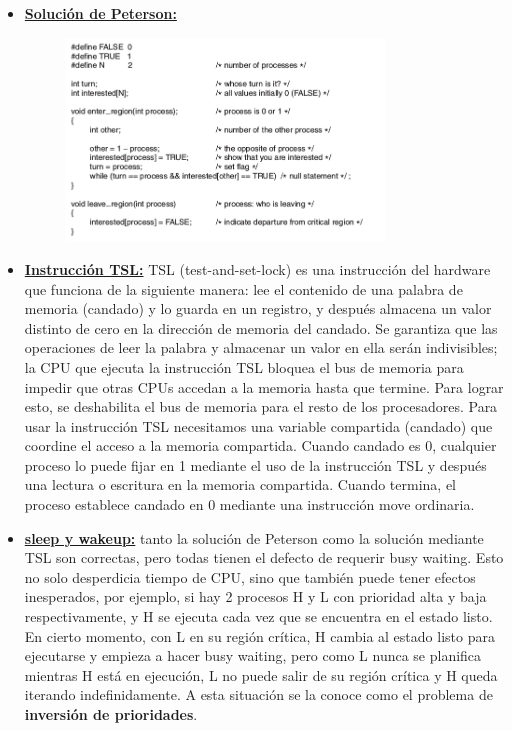 \begin{itemize}
\item \textbf{\underline{Solución de Peterson:}}

\begin{figure}[h]
	\begin{center}
	\includegraphics[width=0.8\textwidth]{imagenes/peterson.jpg}
	\end{center}
\end{figure}

\item \textbf{\underline{Instrucción TSL:}} TSL (test-and-set-lock) es una instrucción del hardware que funciona de la siguiente manera: lee el contenido de una palabra de memoria (candado) y lo guarda en un registro, y después almacena un valor distinto de cero en la dirección de memoria del candado. Se garantiza que las operaciones de leer la palabra y almacenar un valor en ella serán indivisibles; la CPU que ejecuta la instrucción TSL bloquea el bus de memoria para impedir que otras CPUs accedan a la memoria hasta que termine. Para lograr esto, se deshabilita el bus de memoria para el resto de los procesadores. Para usar la instrucción TSL necesitamos una variable compartida (candado) que coordine el acceso a la memoria compartida. Cuando candado es 0, cualquier proceso lo puede fijar en 1 mediante el uso de la instrucción TSL y después una lectura o escritura en la memoria compartida. Cuando termina, el proceso establece candado en 0 mediante una instrucción move ordinaria.

\item \textbf{\underline{sleep y wakeup:}} tanto la solución de Peterson como la solución mediante TSL son correctas, pero todas tienen el defecto de requerir busy waiting. Esto no solo desperdicia tiempo de CPU, sino que también puede tener efectos inesperados, por ejemplo, si hay 2 procesos H y L con prioridad alta y baja respectivamente, y H se ejecuta cada vez que se encuentra en el estado listo. En cierto momento, con L en su región crítica, H cambia al estado listo para ejecutarse y empieza a hacer busy waiting, pero como L nunca se planifica mientras H está en ejecución, L no puede salir de su región crítica y H queda iterando indefinidamente. A esta situación se la conoce como el problema de \textbf{inversión de prioridades}.


\end{itemize}
